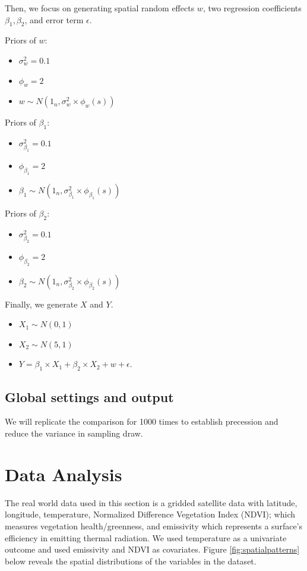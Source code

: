 Then, we focus on generating spatial random effects $w$, two regression coefficients $\beta_1, \beta_2$, and error term $\epsilon$.

Priors of $w$:
\begin{itemize}
    \item $\sigma^2_w = 0.1$ 
    \item $\phi_w =2$
    \item $w\sim N(1_n, \sigma^2_w\times\phi_w(s))$
\end{itemize}

Priors of $\beta_1$:
\begin{itemize}
    \item $\sigma^2_{\beta_1} = 0.1$ 
    \item $\phi_{\beta_1} =2$
    \item ${\beta_1}\sim N(1_n, \sigma^2_{\beta_1}\times\phi_{\beta_1}(s))$
\end{itemize}

Priors of $\beta_2$:
\begin{itemize}
    \item $\sigma^2_{\beta_2} = 0.1$ 
    \item $\phi_{\beta_2} =2$
    \item ${\beta_2}\sim N(1_n, \sigma^2_{\beta_2}\times\phi_{\beta_2}(s))$
\end{itemize}

Finally, we generate $X$ and $Y$.

\begin{itemize}
    \item $X_1 \sim N(0,1)$
    \item $X_2 \sim N(5,1)$
    \item $Y = \beta_1 \times X_1 + \beta_2 \times X_2 + w + \epsilon$.
\end{itemize}

\subsection{Global settings and output}
We will replicate the comparison for 1000 times to establish precession and reduce the variance in sampling draw.

\section{Data Analysis}
\label{sec:data analysis}
The real world data used in this section is a gridded satellite data with latitude, longitude, temperature, Normalized Difference Vegetation Index (NDVI); which measures vegetation health/greenness, and emissivity which represents a surface's efficiency in emitting thermal radiation. We used temperature as a univariate outcome and used emissivity and NDVI as covariates.
Figure \ref{fig:spatialpatterns} below reveals the spatial  distributions of the variables in the dataset.

